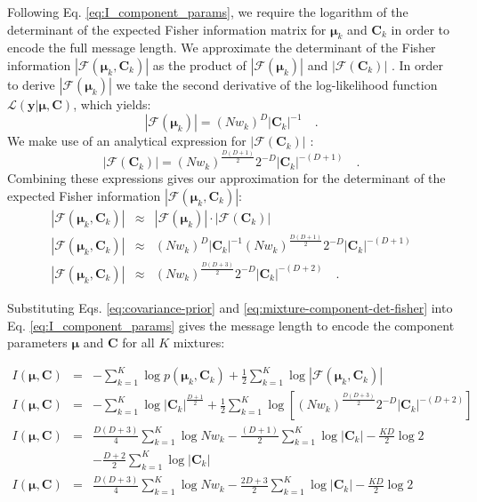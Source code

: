 \documentclass{elsarticle}
\newcommand{\vect}[1]{\boldsymbol{\mathbf{#1}}}
\def\veccov{\vect{C}}
\def\vecmean{\vect{\mu}}
\def\weight{w}
\def\datum{y}
\def\data{\vect{\datum}}
\def\likelihood{\mathcal{L}}
\newcommand{\fisher}[1]{\mathcal{F}\left(#1\right)}
\newcommand{\detfisher}[1]{\left|\fisher{#1}\right|}
\newcommand{\prior}[1]{p\left(#1\right)}
\begin{document}
Following Eq. \ref{eq:I_component_params}, we require the logarithm of the
determinant of the expected Fisher information matrix for $\vecmean_k$ and
$\veccov_k$ in order to encode the full message length. We approximate the
determinant of the Fisher information $\detfisher{{\vecmean_k, \veccov_k}}$ 
as the product of $\detfisher{\vecmean_k}$ and $\detfisher{\veccov_k}$ 
\cite{Oliver_1996,Roberts_1998}. In order to derive $\detfisher{\vecmean_k}$
we take the second derivative of the log-likelihood function 
$\likelihood(\data|\vecmean,\veccov)$, which yields:
\begin{equation}
  \detfisher{\vecmean_k} = (N\weight_k)^{D}|\veccov_k|^{-1} \quad .
\end{equation}
We make use of an analytical expression for $\detfisher{\veccov_k}$
\cite{Dwyer_1967,Magnus_1988}:
\begin{equation}
  \detfisher{\veccov_k} = (N\weight_k)^\frac{D(D+1)}{2}2^{-D}|\veccov_k|^{-(D+1)} \quad .
\end{equation}
Combining these expressions gives our approximation for the determinant of
the expected Fisher information $\detfisher{{\vecmean_k,\veccov_k}}$:
\begin{eqnarray}
  \detfisher{{\vecmean_k,\veccov_k}} & \approx & \detfisher{\vecmean_k} \cdot \detfisher{\veccov_k} \nonumber \\
  \detfisher{{\vecmean_k,\veccov_k}} & \approx & (N\weight_k)^{D}|\veccov_k|^{-1}(N\weight_k)^\frac{D(D+1)}{2}2^{-D}|\veccov_k|^{-(D+1)} \nonumber \\
  \detfisher{{\vecmean_k,\veccov_k}} & \approx & (N\weight_k)^\frac{D(D+3)}{2}2^{-D}|\veccov_k|^{-(D+2)} \quad .
  \label{eq:mixture-component-det-fisher}
\end{eqnarray}


Substituting Eqs. \ref{eq:covariance-prior} and \ref{eq:mixture-component-det-fisher} 
into Eq. \ref{eq:I_component_params} gives the message length to encode the component
parameters $\vecmean$ and $\veccov$ for all $K$ mixtures:

\begin{eqnarray}
  I(\vecmean,\veccov) &=& -\sum_{k=1}^{K}\log{\prior{{\vecmean_k,\veccov_k}}} + \frac{1}{2}\sum_{k=1}^{K}\log{\detfisher{{\vecmean_k,\veccov_k}}} \nonumber \\
  I(\vecmean,\veccov) &=& -\sum_{k=1}^{K}\log{|\veccov_k|^{\frac{D + 1}{2}}}
	+ \frac{1}{2}\sum_{k=1}^{K}\log{\left[(N\weight_k)^\frac{D(D+3)}{2}2^{-D}|\veccov_k|^{-(D+2)}\right]} \nonumber \\
  I(\vecmean,\veccov) &=& \frac{D(D+3)}{4}\sum_{k=1}^{K}\log{N\weight_k} -\frac{(D + 1)}{2}\sum_{k=1}^{K}\log{|\veccov_k|}
	-\frac{KD}{2}\log{2} \nonumber \\
  && -\frac{D+2}{2}\sum_{k=1}^{K}\log{|\veccov_k|} \nonumber \\
  I(\vecmean,\veccov) &=& \frac{D(D+3)}{4}\sum_{k=1}^{K}\log{N\weight_k} -\frac{2D+3}{2}\sum_{k=1}^{K}\log{|\veccov_k|} - \frac{KD}{2}\log{2} 
\end{eqnarray}
\end{document}
